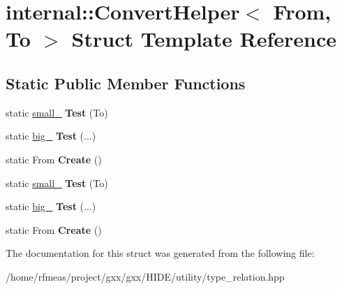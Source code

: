 \hypertarget{structinternal_1_1ConvertHelper}{}\section{internal\+:\+:Convert\+Helper$<$ From, To $>$ Struct Template Reference}
\label{structinternal_1_1ConvertHelper}
\subsection*{Static Public Member Functions}
\begin{DoxyCompactItemize}
\item 
static \hyperlink{structsmall__}{small\+\_\+} {\bfseries Test} (To)\hypertarget{structinternal_1_1ConvertHelper_a07e36f50c2636da7b7529f2c43e09023}{}\label{structinternal_1_1ConvertHelper_a07e36f50c2636da7b7529f2c43e09023}

\item 
static \hyperlink{structbig__}{big\+\_\+} {\bfseries Test} (...)\hypertarget{structinternal_1_1ConvertHelper_a83c7c2d2612aa9954b26a6f6710eac9d}{}\label{structinternal_1_1ConvertHelper_a83c7c2d2612aa9954b26a6f6710eac9d}

\item 
static From {\bfseries Create} ()\hypertarget{structinternal_1_1ConvertHelper_a111a307f49b614d29529e5cb8280acd9}{}\label{structinternal_1_1ConvertHelper_a111a307f49b614d29529e5cb8280acd9}

\item 
static \hyperlink{structsmall__}{small\+\_\+} {\bfseries Test} (To)\hypertarget{structinternal_1_1ConvertHelper_a07e36f50c2636da7b7529f2c43e09023}{}\label{structinternal_1_1ConvertHelper_a07e36f50c2636da7b7529f2c43e09023}

\item 
static \hyperlink{structbig__}{big\+\_\+} {\bfseries Test} (...)\hypertarget{structinternal_1_1ConvertHelper_a83c7c2d2612aa9954b26a6f6710eac9d}{}\label{structinternal_1_1ConvertHelper_a83c7c2d2612aa9954b26a6f6710eac9d}

\item 
static From {\bfseries Create} ()\hypertarget{structinternal_1_1ConvertHelper_a111a307f49b614d29529e5cb8280acd9}{}\label{structinternal_1_1ConvertHelper_a111a307f49b614d29529e5cb8280acd9}

\end{DoxyCompactItemize}


The documentation for this struct was generated from the following file\+:\begin{DoxyCompactItemize}
\item 
/home/rfmeas/project/gxx/gxx/\+H\+I\+D\+E/utility/type\+\_\+relation.\+hpp\end{DoxyCompactItemize}
